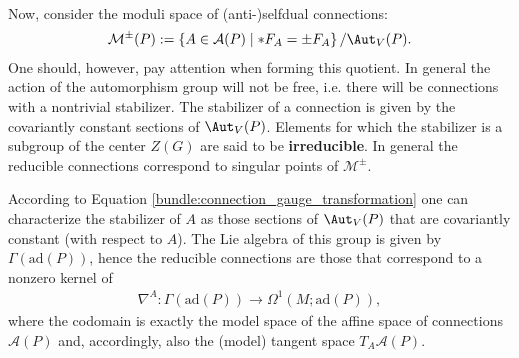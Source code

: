     Now, consider the moduli space of (anti-)selfdual connections:
    \begin{gather}
        \mathcal{M}^\pm(P) := \{A\in\mathcal{A}(P)\mid\ast F_A=\pm F_A\}\, / \Aut_V(P).
    \end{gather}
    One should, however, pay attention when forming this quotient. In general the action of the automorphism group will not be free, i.e. there will be connections with a nontrivial stabilizer. The stabilizer of a connection is given by the covariantly constant sections of $\Aut_V(P)$. Elements for which the stabilizer is a subgroup of the center $Z(G)$ are said to be \textbf{irreducible}. In general the reducible connections correspond to singular points of $\mathcal{M}^\pm$.

    According to Equation \eqref{bundle:connection_gauge_transformation} one can characterize the stabilizer of $A$ as those sections of $\Aut_V(P)$ that are covariantly constant (with respect to $A$). The Lie algebra of this group is given by $\Gamma(\mathrm{ad}(P))$, hence the reducible connections are those that correspond to a nonzero kernel of
    \begin{gather}
        \nabla^A:\Gamma(\mathrm{ad}(P))\rightarrow\Omega^1(M;\mathrm{ad}(P)),
    \end{gather}
    where the codomain is exactly the model space of the affine space of connections $\mathcal{A}(P)$ and, accordingly, also the (model) tangent space $T_A\mathcal{A}(P)$.

